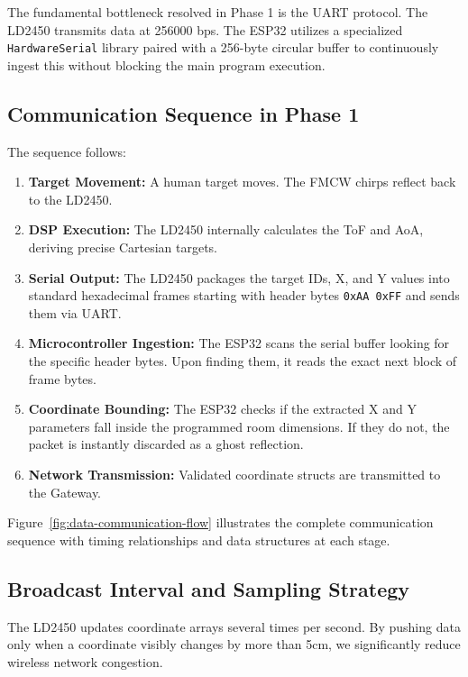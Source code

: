 The fundamental bottleneck resolved in Phase 1 is the UART protocol. The LD2450 transmits data at 256000 bps. The ESP32 utilizes a specialized \texttt{HardwareSerial} library paired with a 256-byte circular buffer to continuously ingest this without blocking the main program execution.

\subsection{Communication Sequence in Phase 1}
\label{subsec:comm-sequence-phase1}

The sequence follows:
\begin{enumerate}
    \item \textbf{Target Movement:} A human target moves. The FMCW chirps reflect back to the LD2450.
    \item \textbf{DSP Execution:} The LD2450 internally calculates the ToF and AoA, deriving precise Cartesian targets.
    \item \textbf{Serial Output:} The LD2450 packages the target IDs, X, and Y values into standard hexadecimal frames starting with header bytes \texttt{0xAA 0xFF} and sends them via UART.
    \item \textbf{Microcontroller Ingestion:} The ESP32 scans the serial buffer looking for the specific header bytes. Upon finding them, it reads the exact next block of frame bytes.
    \item \textbf{Coordinate Bounding:} The ESP32 checks if the extracted X and Y parameters fall inside the programmed room dimensions. If they do not, the packet is instantly discarded as a ghost reflection.
    \item \textbf{Network Transmission:} Validated coordinate structs are transmitted to the Gateway.
\end{enumerate}

Figure~\ref{fig:data-communication-flow} illustrates the complete communication sequence with timing relationships and data structures at each stage.

\subsection{Broadcast Interval and Sampling Strategy}
\label{subsec:broadcast-interval}

The LD2450 updates coordinate arrays several times per second. By pushing data only when a coordinate visibly changes by more than 5cm, we significantly reduce wireless network congestion.


